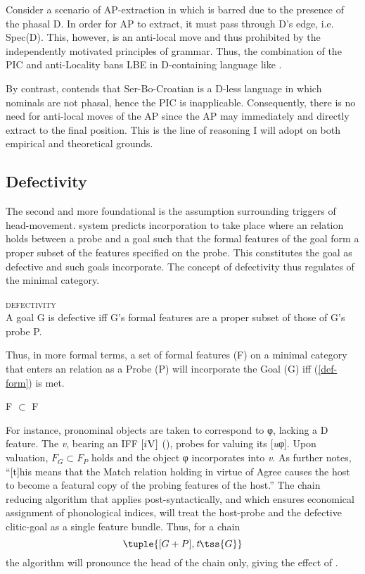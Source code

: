 \documentclass[output=paper]{langsci/langscibook}
\begin{document}
Consider a scenario of AP-extraction in  which is barred due to the
presence of the phasal D. In order for AP to extract, it must pass through D's
edge, i.e. Spec(D). This, however, is an anti-local move and thus
prohibited by the independently motivated principles of grammar. Thus, the
combination of the PIC and anti-Locality bans \gls{LBE} in D-containing language like .

By contrast, \citet{Boskovic:2005,Boskovic2008} contends that
Ser-Bo-Croatian is a D-less language in which nominals are not phasal, hence
the PIC is inapplicable. Consequently, there is no need for anti-local moves of
the AP since the AP may immediately and directly extract to the final position.
This is the line of reasoning I will adopt on both empirical and theoretical
grounds.

\subsection{Defectivity}\label{subsec:def}

The second and more foundational is the assumption surrounding triggers of
head-movement.  system predicts
incorporation to take place where an  relation holds between a probe
and a goal such that the formal features of the goal form a proper subset of
the features specified on the probe. This constitutes the goal as defective and
such goals incorporate.  The concept of defectivity thus regulates
 of the minimal category.

\begin{exe}
\ex \textsc{defectivity} \citep{Roberts2010}\\
A goal G is defective iff G's formal features are a proper subset of those of G's probe P.
\end{exe}

Thus, in more formal terms, a set of formal features (F) on a minimal category
that enters an  relation as a Probe (P) will incorporate the Goal
(G) iff (\ref{def-form}) is met.

\begin{exe}
    \ex F $\subset$ F
\label{def-form}
\end{exe}

For instance,  pronominal objects  are taken to
correspond to φ, lacking a D feature. The \emph{v},
bearing an \gls{IFF} $[i\textsc{V}]$ (),  probes
for valuing its [\emph{u}φ]. Upon valuation, $F_G \subset F_P$ holds and the
object φ incorporates into \emph{v}. As
\citet[391]{roberts:2012uq} further notes, ``[t]his means that the Match
relation holding in virtue of Agree causes the host to become a featural copy
of the probing features of the host.'' The chain reducing algorithm that
applies post-syntactically, and which ensures economical assignment of
phonological indices, will treat the host-probe and the defective clitic-goal
as a single feature bundle. Thus, for a chain \[\tuple{[G+P],\emph{t}\tss{G}}\]
the algorithm will pronounce the head of the chain only, giving the effect of
.
\end{document}
